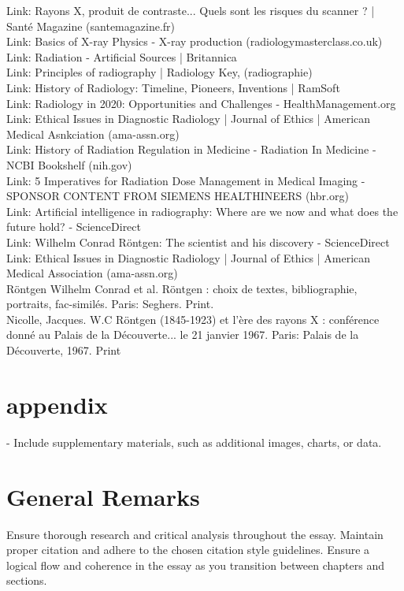 \documentclass[a4paper,12pt]{report}
\begin{document}
Link: Rayons X, produit de contraste... Quels sont les risques du scanner ? | Santé Magazine (santemagazine.fr)  \\
Link: Basics of X-ray Physics - X-ray production (radiologymasterclass.co.uk) \\
Link: Radiation - Artificial Sources | Britannica  \\
Link: Principles of radiography | Radiology Key, (radiographie) \\
Link: History of Radiology: Timeline, Pioneers, Inventions | RamSoft \\
Link: Radiology in 2020: Opportunities and Challenges - HealthManagement.org \\
Link: Ethical Issues in Diagnostic Radiology | Journal of Ethics | American Medical Asnkciation (ama-assn.org) \\
Link: History of Radiation Regulation in Medicine - Radiation In Medicine - NCBI Bookshelf (nih.gov) \\
Link: 5 Imperatives for Radiation Dose Management in Medical Imaging - SPONSOR CONTENT FROM SIEMENS HEALTHINEERS (hbr.org) \\
Link: Artificial intelligence in radiography: Where are we now and what does the future hold? - ScienceDirect \\
Link: Wilhelm Conrad Röntgen: The scientist and his discovery - ScienceDirect \\
Link: Ethical Issues in Diagnostic Radiology | Journal of Ethics | American Medical Association (ama-assn.org) \\

Röntgen Wilhelm Conrad et al. Röntgen : choix de textes, bibliographie, portraits, fac-similés. Paris: Seghers. Print. \\

Nicolle, Jacques. W.C Röntgen (1845-1923) et l'ère des rayons X : conférence donné au Palais de la Découverte... le 21 janvier 1967. Paris: Palais de la Découverte, 1967. Print \\
\printbibliography
\appendix
\section*{\Huge{appendix}}
- Include supplementary materials, such as additional images, charts, or data.
\section*{General Remarks}
Ensure thorough research and critical analysis throughout the essay. Maintain proper citation and adhere to the chosen citation style guidelines. Ensure a logical flow and coherence in the essay as you transition between chapters and sections.
\end{document}
